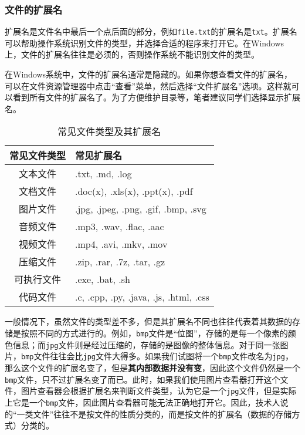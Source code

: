 \subsubsection{文件的扩展名}

扩展名是文件名中最后一个点后面的部分，例如\texttt{file.txt}的扩展名是\texttt{txt}。扩展名可以帮助操作系统识别文件的类型，并选择合适的程序来打开它。在Windows上，文件的扩展名往往是必须的，否则操作系统不能识别文件的类型。

在Windows系统中，文件的扩展名通常是隐藏的。如果你想查看文件的扩展名，可以在文件资源管理器中点击“查看”菜单，然后选择“文件扩展名”选项。这样就可以看到所有文件的扩展名了。为了方便维护目录等，笔者建议同学们选择显示扩展名。

\begin{table}[ht]
  \centering
  \begin{tabular}{c|l}
    \toprule
    常见文件类型 & 常见扩展名 \\
    \midrule
    文本文件 & .txt, .md, .log \\
    文档文件 & .doc(x), .xls(x), .ppt(x), .pdf \\
    图片文件 & .jpg, .jpeg, .png, .gif, .bmp, .svg \\
    音频文件 & .mp3, .wav, .flac, .aac \\
    视频文件 & .mp4, .avi, .mkv, .mov \\
    压缩文件 & .zip, .rar, .7z, .tar, .gz \\
    可执行文件 & .exe, .bat, .sh \\
    代码文件 & .c, .cpp, .py, .java, .js, .html, .css \\
    \bottomrule
  \end{tabular}
  \caption{常见文件类型及其扩展名}
  \label{tab:file-extensions}
\end{table}

一般情况下，虽然文件的类型差不多，但是其扩展名不同也往往代表着其数据的存储是按照不同的方式进行的。例如，\texttt{bmp}文件是“位图”，存储的是每一个像素的颜色信息；而\texttt{jpg}文件则是经过压缩的，存储的是图像的整体信息。对于同一张图片，\texttt{bmp}文件往往会比\texttt{jpg}文件大得多。如果我们试图将一个\texttt{bmp}文件改名为\texttt{jpg}，那么这个文件的扩展名变了，但是\textbf{其内部数据并没有变}，因此这个文件仍然是一个\texttt{bmp}文件，只不过扩展名变了而已。此时，如果我们使用图片查看器打开这个文件，图片查看器会根据扩展名来判断文件类型，认为它是一个\texttt{jpg}文件，但是实际上它是一个\texttt{bmp}文件，因此图片查看器可能无法正确地打开它。因此，技术人说的“一类文件”往往不是按文件的性质分类的，而是按文件的扩展名（数据的存储方式）分类的。

